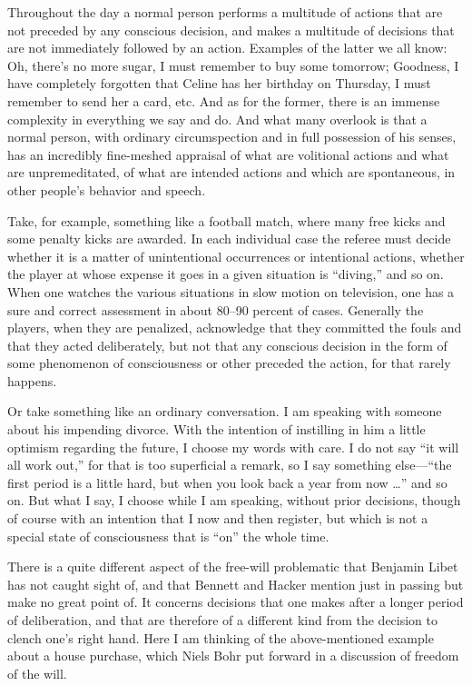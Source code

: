 \documentclass[12pt,a4paper]{book}
\begin{document}
Throughout the day a normal person performs a multitude of actions that are not preceded by any conscious decision, and makes a multitude of decisions that are not immediately followed by an action. Examples of the latter we all know: Oh, there's no more sugar, I must remember to buy some tomorrow; Goodness, I have completely forgotten that Celine has her birthday on Thursday, I must remember to send her a card, etc. And as for the former, there is an immense complexity in everything we say and do. And what many overlook is that a normal person, with ordinary circumspection and in full possession of his senses, has an incredibly fine-meshed appraisal of what are volitional actions and what are unpremeditated, of what are intended actions and which are spontaneous, in other people's behavior and speech.

Take, for example, something like a football match, where many free kicks and some penalty kicks are awarded. In each individual case the referee must decide whether it is a matter of unintentional occurrences or intentional actions, whether the player at whose expense it goes in a given situation is ``diving,'' and so on. When one watches the various situations in slow motion on television, one has a sure and correct assessment in about 80--90 percent of cases. Generally the players, when they are penalized, acknowledge that they committed the fouls and that they acted deliberately, but not that any conscious decision in the form of some phenomenon of consciousness or other preceded the action, for that rarely happens.

Or take something like an ordinary conversation. I am speaking with someone about his impending divorce. With the intention of instilling in him a little optimism regarding the future, I choose my words with care. I do not say ``it will all work out,'' for that is too superficial a remark, so I say something else---``the first period is a little hard, but when you look back a year from now \dots'' and so on. But what I say, I choose while I am speaking, without prior decisions, though of course with an intention that I now and then register, but which is not a special state of consciousness that is ``on'' the whole time.

There is a quite different aspect of the free-will problematic that Benjamin Libet has not caught sight of, and that Bennett and Hacker mention just in passing but make no great point of. It concerns decisions that one makes after a longer period of deliberation, and that are therefore of a different kind from the decision to clench one's right hand. Here I am thinking of the above-mentioned example about a house purchase, which Niels Bohr put forward in a discussion of freedom of the will.
\end{document}
